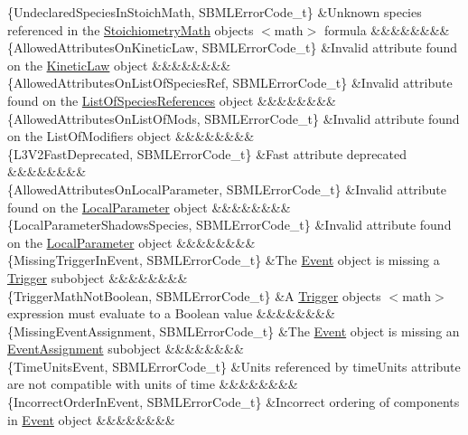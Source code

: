 \begin{DoxyParagraph}{}
\begin{longtabu}
\{Undeclared\+Species\+In\+Stoich\+Math, S\+B\+M\+L\+Error\+Code\+\_\+t\} &Unknown species referenced in the \hyperlink{class_stoichiometry_math}{Stoichiometry\+Math} object\textquotesingle{}s {\ttfamily $<$math$>$} formula &&&&&&&&\\
\{Allowed\+Attributes\+On\+Kinetic\+Law, S\+B\+M\+L\+Error\+Code\+\_\+t\} &Invalid attribute found on the \hyperlink{class_kinetic_law}{Kinetic\+Law} object &&&&&&&&\\
\{Allowed\+Attributes\+On\+List\+Of\+Species\+Ref, S\+B\+M\+L\+Error\+Code\+\_\+t\} &Invalid attribute found on the \hyperlink{class_list_of_species_references}{List\+Of\+Species\+References} object &&&&&&&&\\
\{Allowed\+Attributes\+On\+List\+Of\+Mods, S\+B\+M\+L\+Error\+Code\+\_\+t\} &Invalid attribute found on the List\+Of\+Modifiers object &&&&&&&&\\
\{L3\+V2\+Fast\+Deprecated, S\+B\+M\+L\+Error\+Code\+\_\+t\} &Fast attribute deprecated &&&&&&&&\\
\{Allowed\+Attributes\+On\+Local\+Parameter, S\+B\+M\+L\+Error\+Code\+\_\+t\} &Invalid attribute found on the \hyperlink{class_local_parameter}{Local\+Parameter} object &&&&&&&&\\
\{Local\+Parameter\+Shadows\+Species, S\+B\+M\+L\+Error\+Code\+\_\+t\} &Invalid attribute found on the \hyperlink{class_local_parameter}{Local\+Parameter} object &&&&&&&&\\
\{Missing\+Trigger\+In\+Event, S\+B\+M\+L\+Error\+Code\+\_\+t\} &The \hyperlink{class_event}{Event} object is missing a \hyperlink{class_trigger}{Trigger} subobject &&&&&&&&\\
\{Trigger\+Math\+Not\+Boolean, S\+B\+M\+L\+Error\+Code\+\_\+t\} &A \hyperlink{class_trigger}{Trigger} object\textquotesingle{}s {\ttfamily $<$math$>$} expression must evaluate to a Boolean value &&&&&&&&\\
\{Missing\+Event\+Assignment, S\+B\+M\+L\+Error\+Code\+\_\+t\} &The \hyperlink{class_event}{Event} object is missing an \hyperlink{class_event_assignment}{Event\+Assignment} subobject &&&&&&&&\\
\{Time\+Units\+Event, S\+B\+M\+L\+Error\+Code\+\_\+t\} &Units referenced by \textquotesingle{}time\+Units\textquotesingle{} attribute are not compatible with units of time &&&&&&&&\\
\{Incorrect\+Order\+In\+Event, S\+B\+M\+L\+Error\+Code\+\_\+t\} &Incorrect ordering of components in \hyperlink{class_event}{Event} object &&&&&&&&\\

\end{longtabu}
\end{DoxyParagraph}
